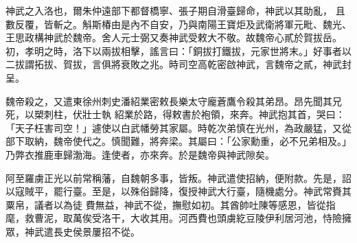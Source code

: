 \begin{pinyinscope}
 神武之入洛也，爾朱仲遠部下都督橋寧、張子期自滑臺歸命，神武以其助亂，
 且數反覆，皆斬之。斛斯椿由是內不自安，乃與南陽王寶炬及武衛將軍元毗、魏光、王思政構神武於魏帝。舍人元士弼又奏神武受敕大不敬。故魏帝心貳於賀拔岳。初，孝明之時，洛下以兩拔相擊，謠言曰：「銅拔打鐵拔，元家世將末。」好事者以二拔謂拓拔、賀拔，言俱將衰敗之兆。時司空高乾密啟神武，言魏帝之貳，神武封呈。



 魏帝殺之，又遣東徐州刺史潘紹業密敕長樂太守龐蒼鷹令殺其弟昂。昂先聞其兄死，以槊刺柱，伏壯士執
 紹業於路，得敕書於袍領，來奔。神武抱其首，哭曰：「天子枉害司空！」遽使以白武幡勞其家屬。時乾次弟慎在光州，為政嚴猛，又從部下取納，魏帝使代之。慎聞難，將奔梁。其屬曰：「公家勳重，必不兄弟相及。」乃弊衣推鹿車歸渤海。逢使者，亦來奔。於是魏帝與神武隙矣。



 阿至羅虜正光以前常稱藩，自魏朝多事，皆叛。神武遣使招納，便附款。先是，詔以寇賊平，罷行臺。至是，以殊俗歸降，復授神武大行臺，隨機處分。神武常賚其粟帛，議者以為徒
 費無益，神武不從，撫慰如初。其酋帥吐陳等感恩，皆從指麾，救曹泥，取萬俟受洛干，大收其用。河西費也頭虜紇豆陵伊利居河池，恃險擁眾，神武遣長史侯景屢招不從。



\end{pinyinscope}